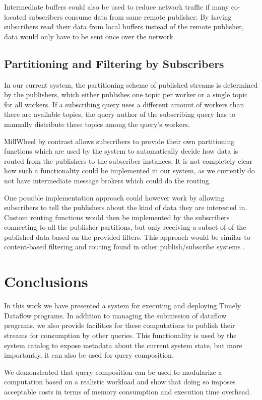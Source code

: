 Intermediate buffers could also be used to reduce network traffic if many
co-located subscribers consume data from same remote publisher: By having
subscribers read their data from local buffers instead of the remote publisher,
data would only have to be sent once over the network.

\subsection{Partitioning and Filtering by Subscribers}

In our current system, the partitioning scheme of published streams is
determined by the publishers, which either publishes one topic per worker or
a single topic for all workers. If a subscribing query uses a different amount
of workers than there are available topics, the query author of the subscribing
query has to manually distribute these topics among the query's workers.

MillWheel by contrast allows subscribers to provide their own partitioning
functions which are used by the system to automatically decide how data is
routed from the publishers to the subscriber instances. It is not completely
clear how such a functionality could be implemented in our system, as we
currently do not have intermediate message brokers which could do the routing.

One possible implementation approach could however work by allowing subscribers
to tell the publishers about the kind of data they are interested in. Custom
routing functions would then be implemented by the subscribers connecting
to all the publisher partitions, but only receiving a subset of of the published
data based on the provided filters. This approach would be similar to
content-based filtering and routing found in other publish/subscribe systems
\cite{pubsub}.

\clearpage
\section{Conclusions}

In this work we have presented a system for executing and deploying Timely
Dataflow programs. In addition to managing the submission of dataflow programs,
we also provide facilities for these computations to publish their streams
for consumption by other queries. This functionality is used by the
system catalog to expose metadata about the current system state, but more
importantly, it can also be used for query composition.

We demonstrated that query composition can be used to modularize a computation
based on a realistic workload and show that doing so imposes acceptable costs
in terms of memory consumption and execution time overhead.



